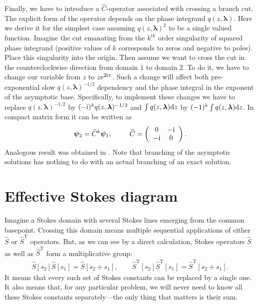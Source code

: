 \documentclass[12pt]{iopart}
\def\S{\widehat{S}}
\def\C{\widehat{C}}
\def\psii{\bm\psi}
\def\lmbd{\bm{\lambda}}
\def\Tp{\mathrm{T}}
\newcommand\phsintgrnd[1][z]{q(#1,\lmbd)}
\newcommand\predexp[1][z]{q(#1,\lmbd)^{-1/2}}
\begin{document}
Finally, we have to introduce a $\C$-operator associated with crossing a branch cut. The explicit form 
of the operator depends on the phase integrand $\phsintgrnd$. Here we derive it for the simplest case  
assuming $\phsintgrnd^2$ to be a single valued function. Imagine the cut emanating from the $k^{th}$ order
singularity of squared phase integrand (positive values of $k$ corresponds to zeros and negative to poles). 
Place this singularity into the origin. Then assume we want to cross the cut in the counterclockwise  
direction from domain $1$ to domain $2$. To do it, we have to change our variable 
from $z$ to $z \mathrm{e}^{2\mathrm{i}\pi}$. Such a change will affect both pre-exponential 
slow $\predexp$ dependency and the phase integral in the exponent of the asymptotic 
base. Specifically, to implement these changes we have to replace $\predexp$ by $(-\rmi)^k \predexp$ 
and $\int \phsintgrnd \rmd z$ by $(-1)^k \int \phsintgrnd \rmd z$. In compact matrix form 
it can be written as
\begin{eqnarray}
\psii_2 = \C^k \psii_1, \qquad
\C =  \left(\begin{array}{*{2}{c}} 0 & -\rmi \\ -\rmi & 0 \end{array}\right).    \label{eq:C}
\end{eqnarray}
Analogous result was obtained in \cite{frbook}. Note that branching of the asymptotic solutions has nothing to do with an actual branching  of  an exact solution.

\section{Effective Stokes diagram \label{sec:effsd}}
Imagine a Stokes domain with several Stokes lines emerging from the common basepoint.
Crossing this domain means multiple sequential applications of either $\S$ or $\S^{\Tp}$ operators. But, as we
can see by a direct calculation, Stokes operators $\S$ as well as $\S^{\Tp}$ form a multiplicative
group:
\begin{eqnarray}
\S[s_2]\S[s_1] = \S[s_2 + s_1], \qquad
\S^{\Tp}[s_2]\S^{\Tp}[s_1] = \S^{\Tp}[s_2 + s_1].
\end{eqnarray}
It means that every such set of Stokes constants can be replaced by a single one. It also means that,
for any particular problem, we will never need to know all these Stokes constants separately---the only
thing that matters is their sum.
\end{document}
